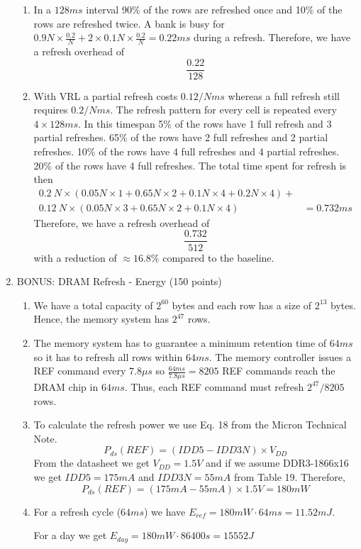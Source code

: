 \documentclass[a4paper]{article}
\begin{document}
\begin{enumerate}
\begin{enumerate}
            \item In a $128ms$ interval 90\% of the rows are refreshed once and 10\% of
                the rows are refreshed twice. A bank is busy for 
                $0.9N \times \frac{0.2}{N} + 2 \times 0.1N \times \frac{0.2}{N} = 0.22ms$
                during a refresh. Therefore, we have a refresh overhead of 
                \[\frac{0.22}{128}\]

            \item With VRL a partial refresh costs $0.12/Nms$ whereas a full
                refresh still requires $0.2/Nms$. The refresh pattern for every cell is
                repeated every $4 \times 128ms$. In this timespan 5\% of the rows have
                1 full refresh and 3 partial refreshes. 65\% of the rows have 2 full
                refreshes and 2 partial refreshes. 10\% of the rows have 4 full refreshes
                and 4 partial refreshes. 20\% of the rows have 4 full refreshes. The total
                time spent for refresh is then
                \begin{align*} 
                    0.2 \ N \times (0.05N \times 1 + 0.65N \times 2 + 0.1N \times 4 + 0.2N \times 4) + \\
                    0.12 \ N \times (0.05N \times 3 + 0.65N \times 2 + 0.1N \times 4) &= 0.732ms
                \end{align*}
                Therefore, we have a refresh overhead of
                \[\frac{0.732}{512}\] with a reduction of $\approx 16.8\%$ compared to the baseline.
        \end{enumerate}
    \item BONUS: DRAM Refresh - Energy (150 points)
        \begin{enumerate}
            \item We have a total capacity of $2^{60}$ bytes and each row has a size of $2^{13}$ bytes.
                Hence, the memory system has $2^{47}$ rows.

            \item The memory system has to guarantee a minimum retention time of $64ms$ so it has to refresh
                all rows within $64ms$. The memory controller issues a REF command every $7.8\mu s$ so 
                $\frac{64ms}{7.8\mu s}=8205$ REF commands reach the DRAM chip in $64ms$. Thus, each REF
                command must refresh $2^{47}/8205$ rows.

            \item To calculate the refresh power we use Eq. 18 from the Micron Technical Note.
                \[P_{ds}(REF) = (IDD5 - IDD3N) \times V_{DD}\]
                From the datasheet we get $V_{DD}=1.5V$ and if we assume DDR3-1866x16 we get $IDD5=175mA$
                and $IDD3N=55mA$ from Table 19. Therefore,
                \[P_{ds}(REF) = (175mA - 55mA) \times 1.5V = 180mW\]

            \item For a refresh cycle ($64ms$) we have $E_{ref} = 180mW \cdot 64ms = 11.52 mJ$. 

                For a day we get $E_{day} = 180mW \cdot 86400 s  = 15552 J$
        \end{enumerate}
\end{enumerate}
\end{document}

